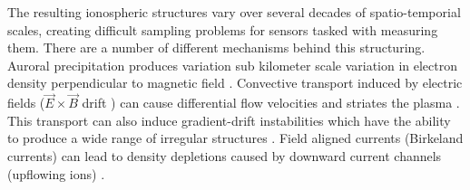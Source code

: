 %
%
%
%

The resulting ionospheric structures vary over several decades of spatio-temporial scales, creating difficult sampling problems for sensors tasked with measuring them. There are a number of different mechanisms behind this structuring. Auroral precipitation produces variation sub kilometer scale variation in electron density perpendicular to magnetic field \cite{Semeter:2005fo}. Convective transport induced by electric fields ($\vec{E}\times\vec{B}$ drift \cite{chen1984introduction}) can cause differential flow velocities and striates the plasma \cite{Tsunoda:1988ul}. This transport can also induce gradient-drift instabilities which have the ability to produce a wide range of irregular structures \cite{GRL:GRL52468}. Field aligned currents (Birkeland currents) can lead to density depletions caused by downward current channels (upflowing ions) \cite{Perry:2015jf}.

